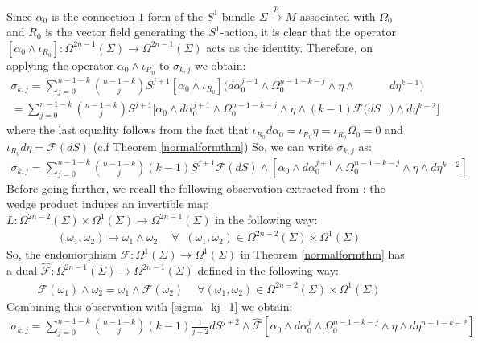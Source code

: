 \documentclass[11pt]{amsart}
\theoremstyle{plain}
\theoremstyle{definition}
\theoremstyle{remark}
\begin{document}
Since $\alpha_0$ is the connection $1$-form of the $S^1$-bundle $\Sigma \xrightarrow{p} M$ associated with $\Omega_0$ and $R_0$ is the vector field generating the $S^1$-action, it is clear that the operator $[\alpha_0 \wedge \iota_{R_0}] : \Omega^{2n-1}(\Sigma) \rightarrow   \Omega^{2n-1}(\Sigma)$ acts as the identity. Therefore, on applying the operator $\alpha_0 \wedge \iota_{R_0}$ to $\sigma_{k,j}$ we obtain:
\begin{align}
 \sigma_{k,j} =  \sum^{n-1-k}_{j=0} \binom{n-1-k}{j} S^{j+1} [\alpha_0 \wedge \iota_{R_0}]  ( d\alpha^{j+1}_0 \wedge \Omega^{n-1-k-j}_0 \wedge \eta \wedge & d\eta^{k-1}) \\\nonumber = \sum^{n-1-k}_{j=0} \binom{n-1-k}{j}  S^{j+1}[\alpha_0 \wedge  d\alpha^{j+1}_0 \wedge \Omega^{n-1-k-j}_0 \wedge \eta \wedge (k-1) \mathcal{F}(dS&) \wedge d\eta^{k-2}]  
\end{align}
where the last equality follows from the fact that $\iota_{R_0} d\alpha_0 = \iota_{R_0} \eta = \iota_{R_0} \Omega_0 =0$ and $\iota_{R_0} d\eta = \mathcal{F}(dS)$ (c.f Theorem \ref{normalformthm})
So, we can write $\sigma_{k,j}$ as:
\begin{align}\label{sigma_kj_1}
\sigma_{k,j} = \sum^{n-1-k}_{j=0} \binom{n-1-k}{j} (k-1) S^{j+1} \mathcal{F}(dS) \wedge [\alpha_0 \wedge  d\alpha^{j+1}_0 \wedge \Omega^{n-1-k-j}_0 \wedge \eta \wedge d\eta^{k-2}]
\end{align}
Before going further, we recall the following observation extracted from \cite{Abbondandolo-Benedetti}: the wedge product induces an invertible map $L: \Omega^{2n-2}(\Sigma) \times \Omega^1(\Sigma) \rightarrow \Omega^{2n-1}(\Sigma)$ in the following way:
        \begin{align}
            (\omega_1,\omega_2) \mapsto \omega_1 \wedge \omega_2 \text{  }\;\;\forall\;\;  (\omega_1,\omega_2) \in \Omega^{2n-2}(\Sigma) \times \Omega^1(\Sigma)
        \end{align}
        So, the endomorphism $\mathcal{F}:\Omega^1(\Sigma) \rightarrow \Omega^1(\Sigma)$ in Theorem \ref{normalformthm} has a dual $\hat{\mathcal{F}}: \Omega^{2n-1}(\Sigma) \rightarrow \Omega^{2n-1}(\Sigma)$ defined in the following way:
        \begin{align}\label{dual_of_endo_F}
            \mathcal{F}(\omega_1)\wedge \omega_2 = \omega_1 \wedge \hat{\mathcal{F}}(\omega_2) \text{ }\;\;\forall  (\omega_1,\omega_2) \in \Omega^{2n-2}(\Sigma) \times \Omega^1(\Sigma) 
        \end{align}
Combining this observation with \eqref{sigma_kj_1} we obtain:      \begin{align}
 \sigma_{k,j} =  \sum^{n-1-k}_{j=0} \binom{n-1-k}{j}(k-1)\frac{1}{j+2} dS^{j+2} \wedge \hat{\mathcal{F}}[\alpha_0 \wedge  d\alpha^j_0 \wedge \Omega^{n-1-k-j}_0 \wedge \eta \wedge d\eta^{n-1-k-2}]
\end{align}
\end{document}
